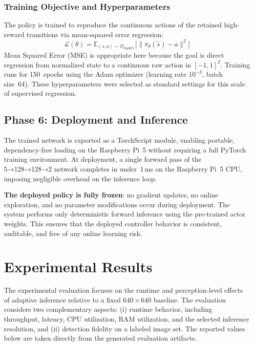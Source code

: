 \documentclass{ieeeaccess}
\begin{document}
\subsubsection*{Training Objective and Hyperparameters}

The policy is trained to reproduce the continuous actions of the
retained high-reward transitions via mean-squared error regression:
\begin{equation}
\mathcal{L}(\theta) = \mathbb{E}_{(s,a)\sim\mathcal{D}_{top30\%}}
\bigl[\|\pi_\theta(\tilde{s}) - a\|^2\bigr]
\end{equation}
Mean Squared Error (MSE) is appropriate here because the goal is direct regression from
normalized state to a continuous raw action in $[-1,1]^2$. Training runs
for 150~epochs using the Adam optimizer (learning rate $10^{-3}$, batch
size~64). These hyperparameters were selected as standard settings for this
scale of supervised regression.

\subsection{Phase 6: Deployment and Inference}

The trained network is exported as a TorchScript module, enabling
portable, dependency-free loading on the Raspberry Pi~5 without requiring
a full PyTorch training environment. At deployment, a single forward pass
of the 5→128→128→2 network completes in under~1\,ms on the Raspberry Pi~5
CPU, imposing negligible overhead on the inference loop.

\textbf{The deployed policy is fully frozen}: no gradient updates, no
online exploration, and no parameter modifications occur during deployment.
The system performs only deterministic forward inference using the
pre-trained actor weights. This ensures that the deployed controller
behavior is consistent, auditable, and free of any online learning risk.

\section{Experimental Results}
\label{sec:experiments}

The experimental evaluation focuses on the runtime and perception-level
effects of adaptive inference relative to a fixed $640\times640$ baseline.
The evaluation considers two complementary aspects: (i) runtime behavior,
including throughput, latency, CPU utilization, RAM utilization, and the
selected inference resolution, and (ii) detection fidelity on a labeled
image set. The reported values below are taken directly from the generated
evaluation artifacts.
\end{document}
